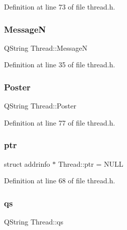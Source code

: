 Definition at line 73 of file thread.\+h.

\mbox{\label{class_thread_a15698411cab05d061db35b2cc3e4299e}} 
\subsubsection{\texorpdfstring{MessageN}{MessageN}}
{\footnotesize\ttfamily Q\+String Thread\+::\+MessageN}



Definition at line 35 of file thread.\+h.

\mbox{\label{class_thread_a4a60de5c09592bf2a778e04ded6e6441}} 
\subsubsection{\texorpdfstring{Poster}{Poster}}
{\footnotesize\ttfamily Q\+String Thread\+::\+Poster\hspace{0.3cm}{\ttfamily [private]}}



Definition at line 77 of file thread.\+h.

\mbox{\label{class_thread_a40a0d1a3ecf39b32382c7838b6ced7bb}} 
\subsubsection{\texorpdfstring{ptr}{ptr}}
{\footnotesize\ttfamily struct addrinfo $\ast$ Thread\+::ptr = N\+U\+LL\hspace{0.3cm}{\ttfamily [private]}}



Definition at line 68 of file thread.\+h.

\mbox{\label{class_thread_a646b66f6fe01dde790ccf875bb112eb6}} 
\subsubsection{\texorpdfstring{qs}{qs}}
{\footnotesize\ttfamily Q\+String Thread\+::qs\hspace{0.3cm}{\ttfamily [private]}}



